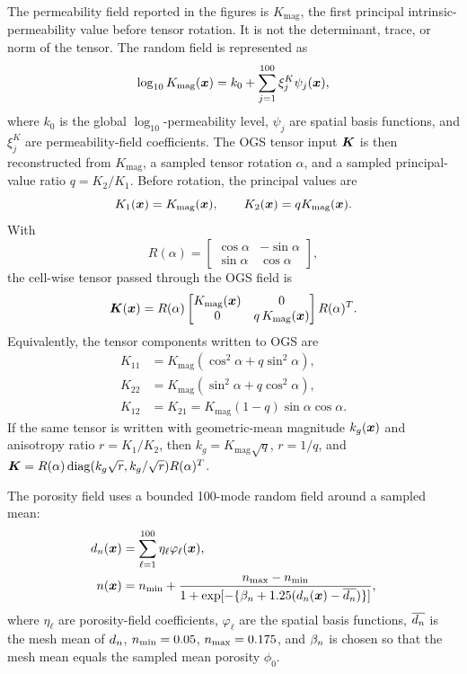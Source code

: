 The permeability field reported in the figures is \(K_{\mathrm{mag}}\), the
first principal intrinsic-permeability value before tensor rotation.  It is not
the determinant, trace, or norm of the tensor.  The random field is represented
as
\begin{equation}
  \log_{10} K_{\mathrm{mag}}(\bm{x})
  = k_0 + \sum_{j=1}^{100} \xi^K_j \psi_j(\bm{x}),
  \label{eq:permeability-magnitude-rf}
\end{equation}
where \(k_0\) is the global \(\log_{10}\)-permeability level, \(\psi_j\) are
spatial basis functions, and \(\xi^K_j\) are permeability-field coefficients.  The
OGS tensor input \(\bm{K}\) is then reconstructed from \(K_{\mathrm{mag}}\), a
sampled tensor rotation \(\alpha\), and a sampled principal-value ratio
\(q=K_{2}/K_{1}\).  Before rotation, the principal values are
\[
K_{1}(\bm{x})=K_{\mathrm{mag}}(\bm{x}),
\qquad
K_{2}(\bm{x})=qK_{\mathrm{mag}}(\bm{x}).
\]
With
\[
R(\alpha)=
\begin{bmatrix}
\cos\alpha & -\sin\alpha\\
\sin\alpha & \cos\alpha
\end{bmatrix},
\]
the cell-wise tensor passed through the OGS  field is
\begin{equation}
  \bm{K}(\bm{x})=
  R(\alpha)
  \begin{bmatrix}
  K_{\mathrm{mag}}(\bm{x}) & 0\\
  0 & q\,K_{\mathrm{mag}}(\bm{x})
  \end{bmatrix}
  R(\alpha)^{T}.
  \label{eq:permeability-ratio-angle-tensor}
\end{equation}
Equivalently, the tensor components written to OGS are
\begin{align}
  K_{11} &= K_{\mathrm{mag}}(\cos^2\alpha + q\sin^2\alpha), \\
  K_{22} &= K_{\mathrm{mag}}(\sin^2\alpha + q\cos^2\alpha), \\
  K_{12} &= K_{21}
  = K_{\mathrm{mag}}(1-q)\sin\alpha\cos\alpha .
  \label{eq:permeability-tensor-components}
\end{align}
If the same tensor is written with geometric-mean magnitude \(k_g(\bm{x})\) and
anisotropy ratio \(r=K_{1}/K_{2}\), then
\(k_g=K_{\mathrm{mag}}\sqrt{q}\), \(r=1/q\), and
\(\bm{K}=R(\alpha)\operatorname{diag}(k_g\sqrt r,k_g/\sqrt r)R(\alpha)^T\).

The porosity field uses a bounded 100-mode random field around a sampled mean:
\begin{align}
  d_{n}(\bm{x}) &= \sum_{\ell=1}^{100}\eta_\ell\varphi_\ell(\bm{x}),\\
  n(\bm{x}) &= n_{\min}
  + \frac{n_{\max}-n_{\min}}
  {1+\exp[-\{\beta_{n}+1.25(d_{n}(\bm{x})-\overline{d_{n}})\}]},
  \label{eq:porosity-kl-field}
\end{align}
where \(\eta_\ell\) are porosity-field coefficients, \(\varphi_\ell\) are the
spatial basis functions, \(\overline{d_{n}}\) is the mesh mean of
\(d_{n}\), \(n_{\min}=0.05\), \(n_{\max}=0.175\), and
\(\beta_{n}\) is chosen so that the mesh mean equals the sampled mean porosity
\(\phi_0\).

